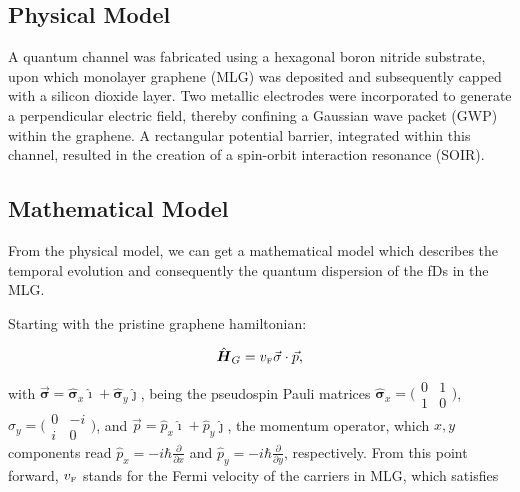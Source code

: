     \subsection{Physical Model}\label{subsec:physical-model}

    A quantum channel was fabricated using a hexagonal boron nitride substrate, upon which monolayer graphene (MLG) was deposited and subsequently capped with a silicon dioxide layer.
     Two metallic electrodes were incorporated to generate a perpendicular electric field, thereby confining a Gaussian wave packet (GWP) within the graphene.
      A rectangular potential barrier, integrated within this channel, resulted in the creation of a spin-orbit interaction resonance (SOIR).


    \subsection{Mathematical Model}\label{subsec:mathematical-model}

    From the physical model, we can get a mathematical model which describes the temporal evolution and consequently the quantum dispersion of the fDs in the MLG\@.

    Starting with the pristine graphene hamiltonian\cite{Geimk2007}:

    \begin{equation}
        \label{eq:pristGr}
        \hat{\mbox{\boldmath $H$}}_G = v_{\mbox{\tiny F}}\vec{\mathbf{\sigma}}\cdot\vec{p},
    \end{equation}

    \noindent with $\vec{\mathbf{\sigma}} = \hat{\mathbf{\sigma}}_{x}\hat{\imath} + \hat{\mathbf{\sigma}}_{y}\hat{\jmath}$, being the pseudospin Pauli matrices $\hat{\mathbf{\sigma}}_{x} = \bigl(\begin{smallmatrix}0&1 \\ 1&0\end{smallmatrix} \bigr)$, $\hat{\sigma}_{y} = \bigl(\begin{smallmatrix}0&-i \\ i&0\end{smallmatrix} \bigr)$, and $\vec{p}=\hat{p}_{x}\hat{\imath}+\hat{p}_{y}\hat{\jmath}$, the momentum operator, which $x, y$ components read $\hat{p}_{x} = -i\hbar\frac{\partial}{\partial x}$ and $\hat{p}_{y} = -i\hbar\frac{\partial}{\partial y}$, respectively.
    From this point forward, $v_{\mbox{\tiny F}}$ stands for the Fermi velocity of the carriers in MLG, which satisfies

